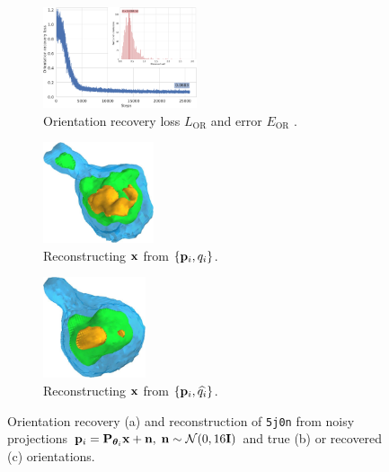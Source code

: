 \begin{figure}[t]
    \centering
    \begin{subfigure}[b]{0.42\textwidth}
        \centering
        \includegraphics[width=\linewidth,height=8em]{figures/5j0n_noise16_ar_aa}
        \caption{%
            Orientation recovery loss $L_\text{OR}$  and error $E_\text{OR}$ .
        }\label{fig:5j0n-noise16-orientation-recovery}
    \end{subfigure}
    \hfill
    \begin{subfigure}[b]{0.27\linewidth}
        \centering
        \includegraphics[height=8em]{figures/5j0n_reconstruction_GT_noise16}
        \caption{Reconstructing $\mathbf{x}$ from $\{ \mathbf{p}_i, q_i \}$.}
    \end{subfigure}
    \hfill
    \begin{subfigure}[b]{0.27\linewidth}
        \centering
        \includegraphics[height=8em]{figures/5j0n_reconstruction_noise16}
        \caption{Reconstructing $\mathbf{x}$ from $\{ \mathbf{p}_i, \widehat{q_i} \}$.}
    \end{subfigure}
    \caption{%
        Orientation recovery (a) and reconstruction of \texttt{5j0n} from noisy projections $\mathbf{p}_i = \mathbf{P}_{{\boldsymbol{\theta}}_i} \mathbf{x} + \mathbf{n}, \; \mathbf{n} \sim \mathcal{N}(0, 16\mathbf{I})$ and true (b) or recovered (c) orientations.
    }\label{fig:5j0n-noise16-reconstruction}
\end{figure}


